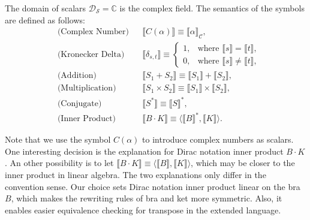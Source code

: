 \documentclass[manuscript, review, timestamp]{acmart}
\newcommand*{\sem}[1]{\llbracket #1 \rrbracket}
\begin{document}
\begin{definition}
  The domain of scalars $\mathcal{D}_\mathcal{S} = \mathbb{C}$ is the complex field.
  The semantics of the symbols are defined as follows:
  \begin{align*}
    & \text{(Complex Number)} &&
    \sem{C(\alpha)} \equiv \sem{\alpha}_\mathcal{C}, \\
    & \text{(Kronecker Delta)} &&
    \sem{\delta_{s, t}} \equiv \left\{
      \begin{array}{ll}
        1, & \text{where } \sem{s} = \sem{t}, \\
        0, & \text{where } \sem{s} \neq \sem{t}, 
      \end{array}
    \right. \\
    & \text{(Addition)} &&
    \sem{S_1 + S_2} \equiv \sem{S_1} + \sem{S_2}, \\
    & \text{(Multiplication)} &&
    \sem{S_1 \times S_2} \equiv \sem{S_1} \times \sem{S_2}, \\
    & \text{(Conjugate)} &&
    \sem{S^*} \equiv \sem{S}^*, \\
    & \text{(Inner Product)} &&
    \sem{B \cdot K} \equiv \langle \sem{B}^*, \sem{K} \rangle.
  \end{align*}
\end{definition}

Note that we use the symbol $C(\alpha)$ to introduce complex numbers as scalars.
One interesting decision is the explanation for Dirac notation inner product $B \cdot K$. An other possibility is to let $\sem{B \cdot K} \equiv \langle \sem{B}, \sem{K} \rangle$, which may be closer to the inner product in linear algebra. The two explanations only differ in the convention sense. Our choice sets Dirac notation inner product linear on the bra $B$, which makes the rewriting rules of bra and ket more symmetric. Also, it enables easier equivalence checking for transpose in the extended language.
\end{document}
